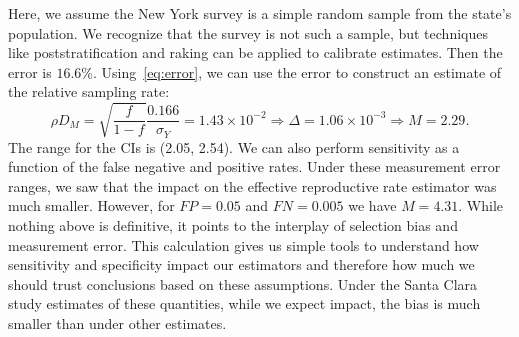 \documentclass[aoas]{amsart}
\begin{document}
Here, we assume the New York survey is a simple random sample from the state's population. We recognize that the survey is not such a sample, but techniques like poststratification and raking can be applied to calibrate estimates. Then the error is $16.6$\%.  Using~\eqref{eq:error}, we can use the error to construct an estimate of the relative sampling rate:
\[
\rho D_M = \sqrt{\frac{f}{1-f}} \frac{\text{0.166}}{\sigma_Y} = 1.43 \times 10^{-2} \Rightarrow \Delta = 1.06 \times 10^{-3} \Rightarrow M = 2.29.
\]
The range for the CIs is (2.05, 2.54).  We can also perform sensitivity as a function of the false negative and positive rates.  Under these measurement error ranges, we saw that the impact on the effective reproductive rate estimator was much smaller.  However, for $FP = 0.05$ and $FN = 0.005$ we have $M = 4.31$.  While nothing above is definitive, it points to the interplay of selection bias and measurement error.  This calculation gives us simple tools to understand how sensitivity and specificity impact our estimators and therefore how much we should trust conclusions based on these assumptions.  Under the Santa Clara study estimates of these quantities, while we expect impact, the bias is much smaller than under other estimates.
\end{document}
